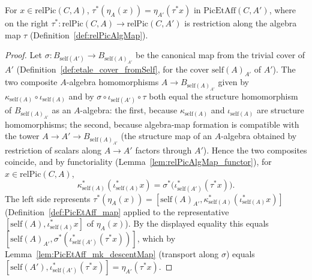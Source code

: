 \begin{theorem}
  \label{thm:PicEtAff_map_unit}
  \leanok
  For \(x \in \mathrm{relPic}(C,A)\), \(\tau^{*}(\eta_A(x)) = \eta_{A'}(\tau^{*}x)\) in
  \(\mathrm{PicEtAff}(C,A')\), where on the right \(\tau^{*} \colon \mathrm{relPic}(C,A) \to
  \mathrm{relPic}(C,A')\) is restriction along the algebra map \(\tau\)
  (Definition~\ref{def:relPicAlgMap}).
\end{theorem}
\begin{proof}
  \leanok
  Let \(\sigma \colon B_{\mathrm{self}(A')} \to B_{\mathrm{self}(A)_{A'}}\) be the canonical map
  from the trivial cover of \(A'\) (Definition~\ref{def:etale_cover_fromSelf}, for the cover
  \(\mathrm{self}(A)_{A'}\) of \(A'\)). The two composite \(A\)-algebra homomorphisms
  \(A \to B_{\mathrm{self}(A)_{A'}}\) given by \(\kappa_{\mathrm{self}(A)} \circ \iota_{
  \mathrm{self}(A)}\) and by \(\sigma \circ \iota_{\mathrm{self}(A')} \circ \tau\) both equal
  the structure homomorphism of \(B_{\mathrm{self}(A)_{A'}}\) as an \(A\)-algebra: the first,
  because \(\kappa_{\mathrm{self}(A)}\) and \(\iota_{\mathrm{self}(A)}\) are structure
  homomorphisms; the second, because algebra-map formation is compatible with the tower
  \(A \to A' \to B_{\mathrm{self}(A)_{A'}}\) (the structure map of an \(A\)-algebra obtained by
  restriction of scalars along \(A \to A'\) factors through \(A'\)). Hence the two composites
  coincide, and by functoriality (Lemma~\ref{lem:relPicAlgMap_functor}), for \(x \in
  \mathrm{relPic}(C,A)\),
  \[
    \kappa_{\mathrm{self}(A)}^{*}(\iota_{\mathrm{self}(A)}^{*}x) = \sigma^{*}\bigl(
    \iota_{\mathrm{self}(A')}^{*}(\tau^{*}x)\bigr).
  \]
  The left side represents \(\tau^{*}(\eta_A(x)) = [\mathrm{self}(A)_{A'},
  \kappa_{\mathrm{self}(A)}^{*}(\iota_{\mathrm{self}(A)}^{*}x)]\)
  (Definition~\ref{def:PicEtAff_map} applied to the representative \([\mathrm{self}(A),
  \iota_{\mathrm{self}(A)}^{*}x]\) of \(\eta_A(x)\)). By the displayed equality this equals
  \([\mathrm{self}(A)_{A'}, \sigma^{*}(\iota_{\mathrm{self}(A')}^{*}(\tau^{*}x))]\), which by
  Lemma~\ref{lem:PicEtAff_mk_descentMap} (transport along \(\sigma\)) equals
  \([\mathrm{self}(A'), \iota_{\mathrm{self}(A')}^{*}(\tau^{*}x)] = \eta_{A'}(\tau^{*}x)\).
\end{proof}

